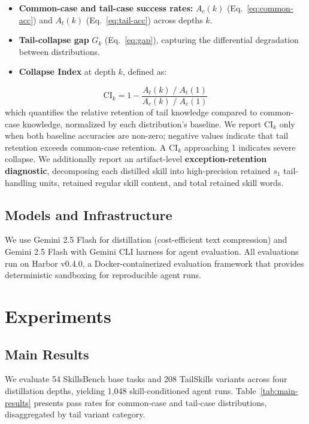 \documentclass[11pt]{article}
\begin{document}
\begin{itemize}
\item \textbf{Common-case and tail-case success rates:} $A_c(k)$ (Eq.~\ref{eq:common-acc}) and $A_t(k)$ (Eq.~\ref{eq:tail-acc}) across depths $k$.
\item \textbf{Tail-collapse gap} $G_k$ (Eq.~\ref{eq:gap}), capturing the differential degradation between distributions.
\item \textbf{Collapse Index} at depth $k$, defined as:
\end{itemize}
\begin{equation}
\mathrm{CI}_k = 1 - \frac{A_t(k) \;/\; A_t(1)}{A_c(k) \;/\; A_c(1)}
\label{eq:ci}
\end{equation}
which quantifies the relative retention of tail knowledge compared to common-case knowledge, normalized by each distribution's baseline. We report $\mathrm{CI}_k$ only when both baseline accuracies are non-zero; negative values indicate that tail retention exceeds common-case retention. A $\mathrm{CI}_k$ approaching 1 indicates severe collapse. We additionally report an artifact-level \textbf{exception-retention diagnostic}, decomposing each distilled skill into high-precision retained $s_1$ tail-handling units, retained regular skill content, and total retained skill words.

\subsection{Models and Infrastructure}

We use Gemini 2.5 Flash for distillation (cost-efficient text compression) and Gemini 2.5 Flash with Gemini CLI harness for agent evaluation. All evaluations run on Harbor v0.4.0, a Docker-containerized evaluation framework that provides deterministic sandboxing for reproducible agent runs.

\section{Experiments}
\subsection{Main Results}

We evaluate 54 SkillsBench base tasks and 208 TailSkills variants across four distillation depths, yielding 1,048 skill-conditioned agent runs. Table~\ref{tab:main-results} presents pass rates for common-case and tail-case distributions, disaggregated by tail variant category.
\end{document}
